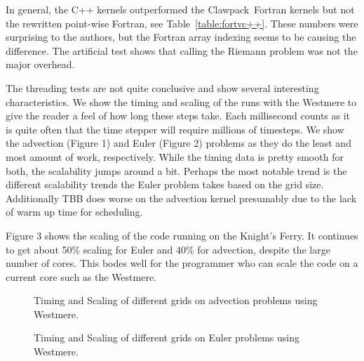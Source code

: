 \documentclass{article}
\def\clawpack{Clawpack~}
\begin{document}
In general, the C++ kernels outperformed the \clawpack Fortran kernels but not
the rewritten point-wise Fortran, see Table~\ref{table:fortvc++}.  These
numbers were surprising to the authors, but the Fortran array indexing seems to
be causing the difference. The artificial test shows that calling the Riemann
problem was not the major overhead.

The threading tests are not quite conclusive and show several interesting
characteristics.  We show the timing and scaling of the runs with the Westmere
to give the reader a feel of how long these steps take.  Each millisecond
counts as it is quite often that the time stepper will require millions of
timesteps.  We show the advection (Figure 1) and Euler (Figure 2) problems as
they do the least and most amount of work, respectively.  While the timing data
is pretty smooth for both, the scalability jumps around a bit.  Perhaps the
most notable trend is the different scalability trends the Euler problem takes
based on the grid size.  Additionally TBB does worse on the advection kernel
presumably due to the lack of warm up time for scheduling.

Figure 3 shows the scaling of the code running on the Knight's Ferry.  It
continues to get about 50\% scaling for Euler and 40\% for advection, despite
the large number of cores. This bodes well for the programmer who can scale the
code on a current core such as the Westmere.

\begin{figure}[ht]
\centering
{}
\label{fig:subfigureExample}
\caption{Timing and Scaling of different grids on advection problems using Westmere.}
\end{figure}

\begin{figure}[ht]
\centering
{}
\label{fig:subfigureExample}
\caption{Timing and Scaling of different grids on Euler problems using Westmere.}
\end{figure}
\end{document}
